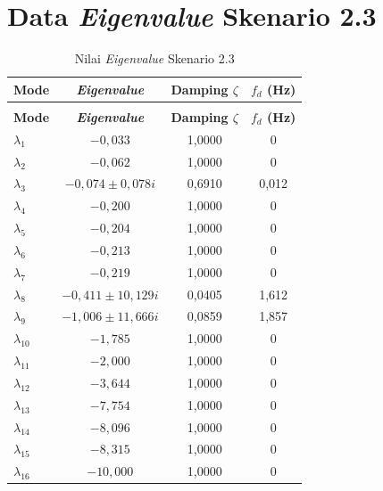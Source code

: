 \section{Data \textit{Eigenvalue} Skenario 2.3}
\begingroup
\fontsize{11}{13.2}\selectfont
\setlength{\tabcolsep}{7pt}
\begin{longtable}{>{\centering\arraybackslash}m{1.5cm} c c c} \caption[]{Nilai
	\textit{Eigenvalue} Skenario 2.3} \label{tab:eigenvalue_sk23_lampiran} \\
	\toprule
	\textbf{Mode} & \textbf{\textit{Eigenvalue}} & \textbf{Damping $\zeta$} &
	\textbf{$f_d$ (Hz)} \\
	\midrule
	\endfirsthead
	\multicolumn{4}{l}{\textit{(lanjutan)}} \\
	\toprule
	\textbf{Mode} & \textbf{\textit{Eigenvalue}} & \textbf{Damping $\zeta$} &
	\textbf{$f_d$ (Hz)} \\
	\midrule
	\endhead
	\bottomrule
	\endfoot
	$\lambda_1$  & $-0{,}033$                    & 1,0000 & 0 \\
	$\lambda_2$  & $-0{,}062$                    & 1,0000 & 0 \\
	$\lambda_3$  & $-0{,}074 \pm 0{,}078i$       & 0,6910 & 0,012 \\
	$\lambda_4$  & $-0{,}200$                    & 1,0000 & 0 \\
	$\lambda_5$  & $-0{,}204$                    & 1,0000 & 0 \\
	$\lambda_6$  & $-0{,}213$                    & 1,0000 & 0 \\
	$\lambda_7$  & $-0{,}219$                    & 1,0000 & 0 \\
	$\lambda_8$  & $-0{,}411 \pm 10{,}129i$      & 0,0405 & 1,612 \\
	$\lambda_9$  & $-1{,}006 \pm 11{,}666i$      & 0,0859 & 1,857 \\
	$\lambda_{10}$ & $-1{,}785$                  & 1,0000 & 0 \\
	$\lambda_{11}$ & $-2{,}000$                  & 1,0000 & 0 \\
	$\lambda_{12}$ & $-3{,}644$                  & 1,0000 & 0 \\
	$\lambda_{13}$ & $-7{,}754$                  & 1,0000 & 0 \\
	$\lambda_{14}$ & $-8{,}096$                  & 1,0000 & 0 \\
	$\lambda_{15}$ & $-8{,}315$                  & 1,0000 & 0 \\
	$\lambda_{16}$ & $-10{,}000$                 & 1,0000 & 0 \\

\end{longtable}
